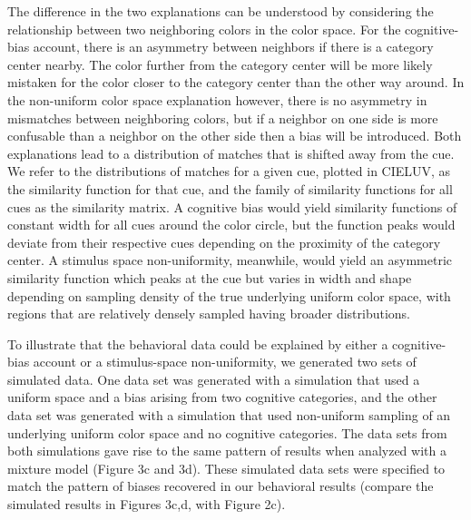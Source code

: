 \documentclass[9pt,biorxiv,lineno,onehalfspacing]{lapreprint}
\begin{document}
\begin{refsection}
The difference in the two explanations can be understood by considering the relationship between two neighboring colors in the color space. 
For the cognitive-bias account, there is an asymmetry between neighbors if there is a category center nearby. 
The color further from the category center will be more likely mistaken for the color closer to the category center than the other way around. 
In the non-uniform color space explanation however, there is no asymmetry in mismatches between neighboring colors, but if a neighbor on one side is more confusable than a neighbor on the other side then a bias will be introduced. 
Both explanations lead to a distribution of matches that is shifted away from the cue. 
We refer to the distributions of matches for a given cue, plotted in CIELUV, as the similarity function for that cue, and the family of similarity functions for all cues as the similarity matrix.
A cognitive bias would yield similarity functions of constant width for all cues around the color circle, but the function peaks would deviate from their respective cues depending on the proximity of the category center. 
A stimulus space non-uniformity, meanwhile, would yield an asymmetric similarity function which peaks at the cue but varies in width and shape depending on sampling density of the true underlying uniform color space, with regions that are relatively densely sampled having broader distributions.

To illustrate that the behavioral data could be explained by either a cognitive-bias account or a stimulus-space non-uniformity, we generated two sets of simulated data.
One data set was generated with a simulation that used a uniform space and a bias arising from two cognitive categories, and the other data set was generated with a simulation that used non-uniform sampling of an underlying uniform color space and no cognitive categories. 
The data sets from both simulations gave rise to the same pattern of results when analyzed with a mixture model \citep{zhang_discrete_2008, bae_why_2015} (Figure 3c and 3d). 
These simulated data sets were specified to match the pattern of biases recovered in our behavioral results (compare the simulated results in Figures 3c,d, with Figure 2c). 


\end{refsection}
\end{document}
